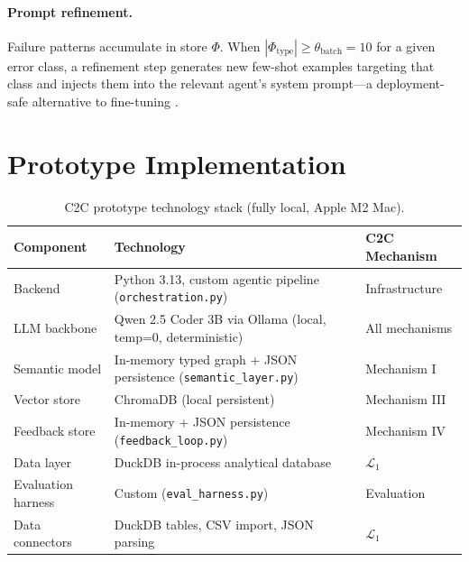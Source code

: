 \documentclass[11pt,a4paper]{article}
\begin{document}
\paragraph{Prompt refinement.}
Failure patterns accumulate in store $\Phi$.  When $|\Phi_\mathrm{type}| \geq
\theta_\mathrm{batch} = 10$ for a given error class, a refinement step generates
new few-shot examples targeting that class and injects them into the relevant
agent's system prompt---a deployment-safe alternative to fine-tuning
\citep{delrosario2025plan}.

\section{Prototype Implementation}\label{sec:impl}

\begin{table}[htbp]
\centering
\caption{C2C prototype technology stack (fully local, Apple M2 Mac).}
\label{tab:stack}
\small
\begin{tabular}{lll}
\toprule
\textbf{Component} & \textbf{Technology} & \textbf{C2C Mechanism} \\
\midrule
Backend              & Python 3.13, custom agentic pipeline (\texttt{orchestration.py}) & Infrastructure \\
LLM backbone         & Qwen 2.5 Coder 3B via Ollama (local, temp=0, deterministic)       & All mechanisms \\
Semantic model       & In-memory typed graph + JSON persistence (\texttt{semantic\_layer.py}) & Mechanism I \\
Vector store         & ChromaDB (local persistent)                                       & Mechanism III \\
Feedback store       & In-memory + JSON persistence (\texttt{feedback\_loop.py})         & Mechanism IV \\
Data layer           & DuckDB in-process analytical database                             & $\mathcal{L}_1$ \\
Evaluation harness   & Custom (\texttt{eval\_harness.py})                                & Evaluation \\
Data connectors      & DuckDB tables, CSV import, JSON parsing                           & $\mathcal{L}_1$ \\
\bottomrule
\end{tabular}
\end{table}
\end{document}
